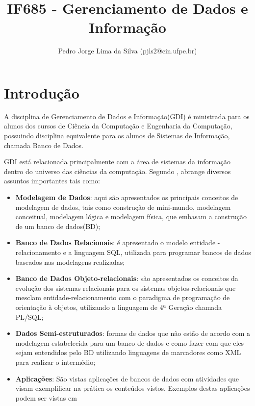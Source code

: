 \documentclass[10pt]{article}
\title{IF685 - Gerenciamento de Dados e Informação}
\author{Pedro Jorge Lima da Silva (pjls2@cin.ufpe.br)}
\date{}
\begin{document}
\maketitle

\section{Introdução}

A disciplina de Gerenciamento de Dados e Informação(GDI) é ministrada para os alunos dos cursos de Ciência da Computação e Engenharia da Computação, possuindo disciplina equivalente para os alunos de Sistemas de Informação, chamada Banco de Dados.

GDI está relacionada principalmente com a área de sistemas da informação dentro do universo das ciências da computação. Segundo \cite{SBD}, abrange diversos assuntos importantes tais como:

\begin{itemize}
    \item \textbf{Modelagem de Dados}: aqui são apresentados os principais conceitos de modelagem de dados, tais como construção de mini-mundo, modelagem conceitual, modelagem lógica e modelagem física, que embasam a construção de um banco de dados(BD);
    
    \item \textbf{Banco de Dados Relacionais}: é apresentado o modelo entidade - relacionamento e  a linguagem SQL, utilizada para programar bancos de dados baseados nas modelagens realizadas;
    
    \item \textbf{Banco de Dados Objeto-relacionais}: são apresentados os conceitos da evolução dos  sistemas relacionais para os sistemas objetos-relacionais que mesclam entidade-relacionamento com o paradigma de programação de orientação à objetos, utilizando a linguagem de 4ª Geração chamada PL/SQL;
    
    \item \textbf{Dados Semi-estruturados}: formas de dados que não estão de acordo com a modelagem estabelecida para um banco de dados e como fazer com que eles sejam entendidos pelo BD utilizando linguagens de marcadores como XML para realizar o intermédio; 
    
    \item \textbf{Aplicações}: São vistas aplicações de bancos de dados com atividades que visam exemplificar na prática os conteúdos vistos. Exemplos destas aplicações podem ser vistas em \cite{SBD2}
    
\end{itemize}
\end{document}
